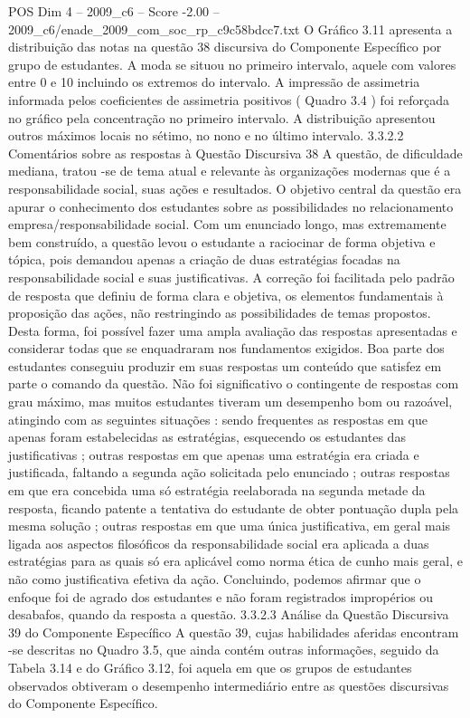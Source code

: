 \begin{textsample}{POS Dim 4 – 2009\_c6 – Score -2.00 – 2009\_c6/enade\_2009\_com\_soc\_rp\_c9c58bdcc7.txt}
O Gráfico 3.11 apresenta a distribuição das notas na questão 38 discursiva do Componente Específico por grupo de estudantes.
A moda se situou no primeiro intervalo, aquele com valores entre 0 e 10 incluindo os extremos do intervalo.
A impressão de assimetria informada pelos coeficientes de assimetria positivos ( Quadro 3.4 ) foi reforçada no gráfico pela concentração no primeiro intervalo.
A distribuição apresentou outros máximos locais no sétimo, no nono e no último intervalo. 3.3.2.2 Comentários sobre as respostas à Questão Discursiva 38 A questão, de dificuldade mediana, tratou -se de tema atual e relevante às organizações modernas que é a responsabilidade social, suas ações e resultados.
O objetivo central da questão era apurar o conhecimento dos estudantes sobre as possibilidades no relacionamento empresa/responsabilidade social.
Com um enunciado longo, mas extremamente bem construído, a questão levou o estudante a raciocinar de forma objetiva e tópica, pois demandou apenas a criação de duas estratégias focadas na responsabilidade social e suas justificativas.
A correção foi facilitada pelo padrão de resposta que definiu de forma clara e objetiva, os elementos fundamentais à proposição das ações, não restringindo as possibilidades de temas propostos.
Desta forma, foi possível fazer uma ampla avaliação das respostas apresentadas e considerar todas que se enquadraram nos fundamentos exigidos.
Boa parte dos estudantes conseguiu produzir em suas respostas um conteúdo que satisfez em parte o comando da questão.
Não foi significativo o contingente de respostas com grau máximo, mas muitos estudantes tiveram um desempenho bom ou razoável, atingindo com as seguintes situações : sendo frequentes as respostas em que apenas foram estabelecidas as estratégias, esquecendo os estudantes das justificativas ; outras respostas em que apenas uma estratégia era criada e justificada, faltando a segunda ação solicitada pelo enunciado ; outras respostas em que era concebida uma só estratégia reelaborada na segunda metade da resposta, ficando patente a tentativa do estudante de obter pontuação dupla pela mesma solução ; outras respostas em que uma única justificativa, em geral mais ligada aos aspectos filosóficos da responsabilidade social era aplicada a duas estratégias para as quais só era aplicável como norma ética de cunho mais geral, e não como justificativa efetiva da ação.
Concluindo, podemos afirmar que o enfoque foi de agrado dos estudantes e não foram registrados impropérios ou desabafos, quando da resposta a questão. 3.3.2.3 Análise da Questão Discursiva 39 do Componente Específico A questão 39, cujas habilidades aferidas encontram -se descritas no Quadro 3.5, que ainda contém outras informações, seguido da Tabela 3.14 e do Gráfico 3.12, foi aquela em que os grupos de estudantes observados obtiveram o desempenho intermediário entre as questões discursivas do Componente Específico.

\end{textsample}
